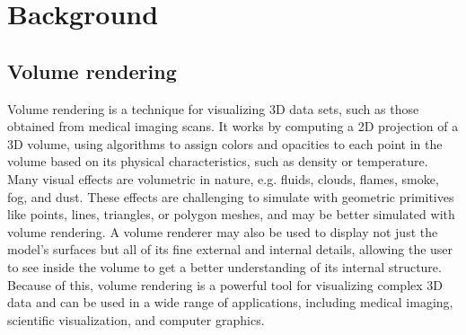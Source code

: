 \chapter{Background} \label{chap:relatedwork}

\section{Volume rendering} \label{sec:volumerendering}
Volume rendering is a technique for visualizing 3D data sets, such as those obtained from medical imaging scans. It works by computing a 2D projection of a 3D volume, using algorithms to assign colors and opacities to each point in the volume based on its physical characteristics, such as density or temperature. Many visual effects are volumetric in nature, e.g. fluids, clouds, flames, smoke, fog, and dust. These effects are challenging to simulate with geometric primitives like points, lines, triangles, or polygon meshes, and may be better simulated with volume rendering. A volume renderer may also be used to display not just the model's surfaces but all of its fine external and internal details, allowing the user to see inside the volume to get a better understanding of its internal structure. Because of this, volume rendering is a powerful tool for visualizing complex 3D data and can be used in a wide range of applications, including medical imaging, scientific visualization, and computer graphics\cite{max_optical_1995}.



